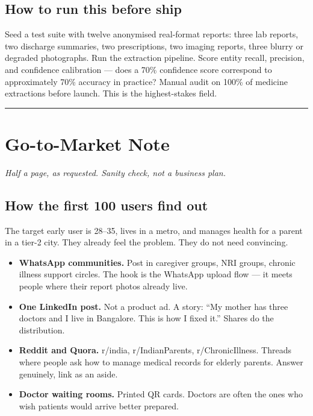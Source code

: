 \documentclass[11pt, a4paper]{article}
\begin{document}
\subsection{How to run this before ship}

Seed a test suite with twelve anonymised real-format reports: three lab reports, two discharge summaries, two prescriptions, two imaging reports, three blurry or degraded photographs. Run the extraction pipeline. Score entity recall, precision, and confidence calibration --- does a 70\% confidence score correspond to approximately 70\% accuracy in practice? Manual audit on 100\% of medicine extractions before launch. This is the highest-stakes field.

\vspace{10pt}
\rule{\linewidth}{0.6pt}

\section*{Go-to-Market Note}

\textit{Half a page, as requested. Sanity check, not a business plan.}

\subsection*{How the first 100 users find out}

The target early user is 28--35, lives in a metro, and manages health for a parent in a tier-2 city. They already feel the problem. They do not need convincing.

\begin{itemize}
  \item \textbf{WhatsApp communities.} Post in caregiver groups, NRI groups, chronic illness support circles. The hook is the WhatsApp upload flow --- it meets people where their report photos already live.
  \item \textbf{One LinkedIn post.} Not a product ad. A story: ``My mother has three doctors and I live in Bangalore. This is how I fixed it.'' Shares do the distribution.
  \item \textbf{Reddit and Quora.} r/india, r/IndianParents, r/ChronicIllness. Threads where people ask how to manage medical records for elderly parents. Answer genuinely, link as an aside.
  \item \textbf{Doctor waiting rooms.} Printed QR cards. Doctors are often the ones who wish patients would arrive better prepared.
\end{itemize}
\end{document}
